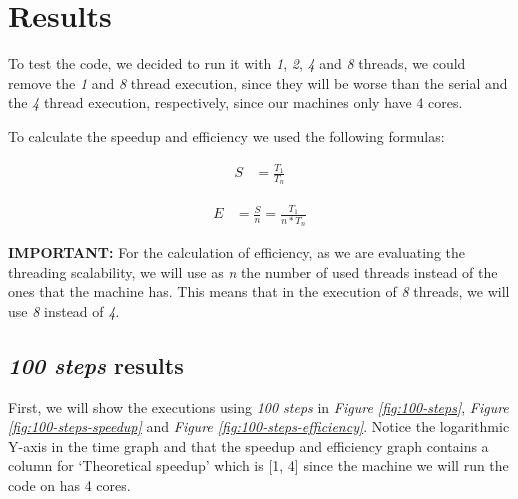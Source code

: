 \documentclass[../main.tex]{subfiles}
\begin{document}
\section{Results} \label{sec:results}

To test the code, we decided to run it with \textit{1}, \textit{2}, \textit{4} and \textit{8} threads, we could remove the \textit{1} and \textit{8} thread execution, since they will be worse than the serial and the \textit{4} thread execution, respectively, since our machines only have 4 cores.

To calculate the speedup and efficiency we used the following formulas:

\begin{equation}
    \begin{split}
        S&=\frac{T_1}{T_n}
    \end{split}
\end{equation}

\begin{equation}
    \begin{split}
        E&=\frac{S}{n}=\frac{T_1}{n * T_n}
    \end{split}
\end{equation}

\textbf{IMPORTANT:} For the calculation of efficiency, as we are evaluating the threading scalability, we will use as \textit{n} the number of used threads instead of the ones that the machine has. This means that in the execution of \textit{8} threads, we will use \textit{8} instead of \textit{4}.

\subsection{\textit{100 steps} results}

First, we will show the executions using \textit{100 steps} in \textit{Figure \ref{fig:100-steps}}, \textit{Figure \ref{fig:100-steps-speedup}} and \textit{Figure \ref{fig:100-steps-efficiency}}. Notice the logarithmic Y-axis in the time graph and that the speedup and efficiency graph contains a column for `Theoretical speedup' which is [1, 4] since the machine we will run the code on has 4 cores.
\end{document}

